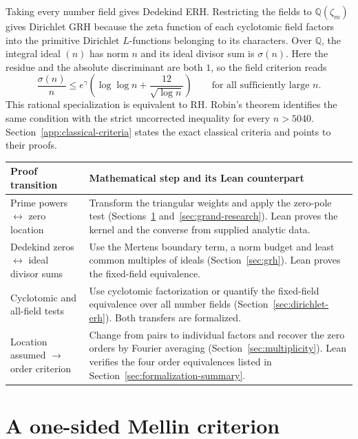 \documentclass[11pt]{amsart}
\theoremstyle{definition}
\theoremstyle{remark}
\numberwithin{equation}{section}
\begin{document}
Taking every number field gives Dedekind ERH. Restricting the fields
to \(\mathbb Q(\zeta_m)\) gives Dirichlet GRH because the zeta function
of each cyclotomic field factors into the primitive Dirichlet
\(L\)-functions belonging to its characters. Over \(\mathbb Q\),
the integral ideal \((n)\) has norm \(n\) and its ideal divisor sum
is \(\sigma(n)\). Here the residue and the absolute discriminant
are both \(1\), so the field criterion reads
\[
 \frac{\sigma(n)}{n}\leq e^\gamma
   \left(\log\log n+\frac{12}{\sqrt{\log n}}\right)
 \qquad\text{for all sufficiently large }n .
\]
This rational specialization is equivalent to RH. Robin's theorem
\cite{Robin1984} identifies the same condition with the strict
uncorrected inequality for every \(n>5040\).
Section~\ref{app:classical-criteria} states the exact classical criteria and points to their proofs.

\begin{center}
\small
\begin{tabular}{@{}>{\raggedright\arraybackslash}p{}
  >{\raggedright\arraybackslash}p{}@{}}
\toprule
Proof transition & Mathematical step and its Lean counterpart\\
\midrule
Prime powers \(\longleftrightarrow\) zero location &
Transform the triangular weights and apply the zero-pole test
(Sections~\ref{sec:positive-mellin} and~\ref{sec:grand-research}).
Lean proves the kernel and the converse from supplied analytic data.\\
Dedekind zeros \(\longleftrightarrow\) ideal divisor sums &
Use the Mertens boundary term, a norm budget and least common
multiples of ideals (Section~\ref{sec:grh}). Lean proves the fixed-field
equivalence.\\
Cyclotomic and all-field tests &
Use cyclotomic factorization or quantify the fixed-field equivalence
over all number fields (Section~\ref{sec:dirichlet-erh}). Both transfers
are formalized.\\
Location assumed \(\longrightarrow\) order criterion &
Change from pairs to individual factors and recover the zero orders
by Fourier averaging (Section~\ref{sec:multiplicity}). Lean verifies
the four order equivalences listed in Section~\ref{sec:formalization-summary}.\\
\bottomrule
\end{tabular}
\end{center}

\section{A one-sided Mellin criterion}\label{sec:positive-mellin}
\end{document}
